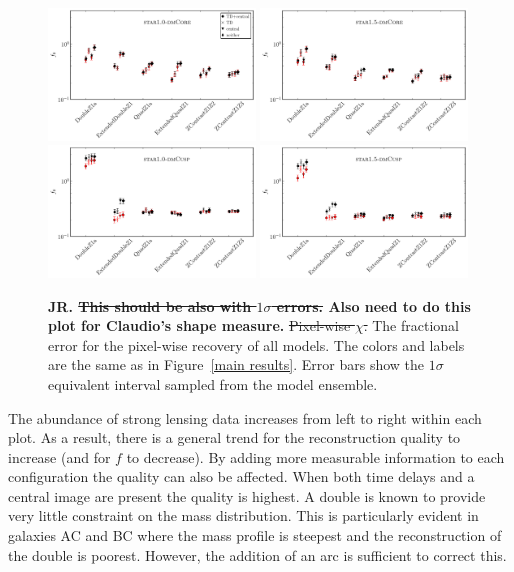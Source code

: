 \documentclass[galley,usenatbib]{mn2e}
\newcommand{\figref}[1] {Figure~\ref{#1}}
\begin{document}
\begin{figure}
\includegraphics[width=0.49\textwidth]{AAferror-1sig.pdf}
\includegraphics[width=0.49\textwidth]{BBferror-1sig.pdf}\\
\includegraphics[width=0.49\textwidth]{ACferror-1sig.pdf}
\includegraphics[width=0.49\textwidth]{BCferror-1sig.pdf}
\caption{ {\bf JR. \sout{ This should be also with $1\sigma$ errors.} Also need to do this plot for Claudio's shape measure.} \sout{Pixel-wise $\chi$.}
The fractional error for the pixel-wise recovery of all models. The colors and labels are the same as in \figref{main results}. Error bars show the $1\sigma$ equivalent interval sampled from the model ensemble.}
\label{main results pixel-wise}
\end{figure}

The abundance of strong lensing data increases from left to right within each plot. As
a result, there is a general trend for the reconstruction quality to increase
(and for $f$ to decrease). By adding more measurable information to each
configuration the quality can also be affected. When both time delays and a
central image are present the quality is highest. A double is known to provide
very little constraint on the mass distribution. This is particularly evident in
galaxies AC and BC where the mass profile is steepest and the reconstruction of
the double is poorest. However, the addition of an arc is sufficient to correct
this.
\end{document}
